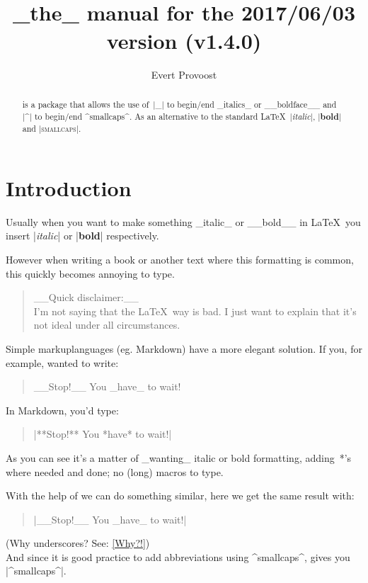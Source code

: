 \documentclass[11pt, cm-default]{l3doc}
\title{\pkg{easyformat}\\[.5em]
		\large _the_ manual for the 2017/06/03 version (v1.4.0)}
\author{Evert Provoost}
\date{}
\begin{document}
	\maketitle
	
	\begin{abstract}
		 is a package that allows the use of~|_| to begin/end
		_italics_ or __boldface__ and |^| to begin/end ^smallcaps^. As an
		alternative to the standard \LaTeX\ |\textit{italic}|, |\textbf{bold}|
		and |\textsc{smallcaps}|.
	\end{abstract}

	\tableofcontents


	\section{Introduction}
	Usually when you want to make something _italic_ or __bold__ in \LaTeX\ you
	insert |\textit{italic}| or |\textbf{bold}| respectively.
	
	However when writing a book or another text where this formatting is common,
	this quickly becomes annoying to type.

	\begin{quote}
	__Quick disclaimer:__\\
	I'm not saying that the \LaTeX\ way is bad. I just want to explain that it's
	not ideal under all circumstances.
	\end{quote}
	
	Simple markuplanguages (eg. Markdown) have a more elegant solution.	
	If you, for example, wanted to write:
	\begin{quote}
		__Stop!__ You _have_ to wait!
	\end{quote}

	In Markdown, you'd type:
	\begin{quote}
		|**Stop!** You *have* to wait!|
	\end{quote}

	As you can see it's a matter of _wanting_ italic or bold formatting, adding~*'s
	where needed and done; no (long) macros to type.
	
	With the help of  we can do something similar, here we get the
	same result with:
	\begin{quote}
		|__Stop!__ You _have_ to wait!|
	\end{quote}
	
	(Why underscores? See: \ref{Why?!})\\
	
	And since it is good practice to add abbreviations using ^smallcaps^,
	 gives you |^smallcaps^|.
	
\end{document}
